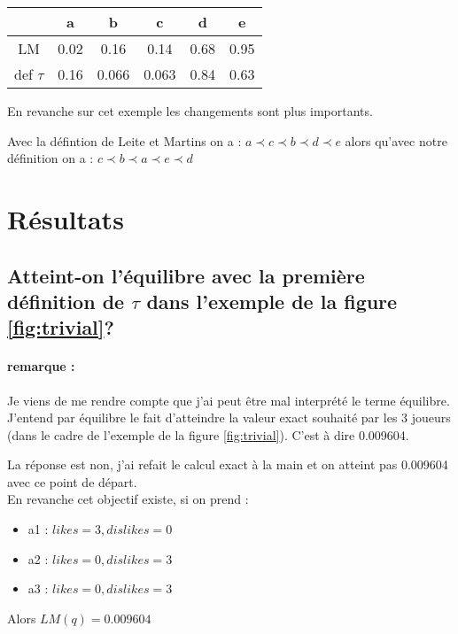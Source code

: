 \documentclass[12pt]{article}
\theoremstyle{defi}
\theoremstyle{not}
\theoremstyle{prob}
\begin{document}
          \begin{tabular}{|c|c|c|c|c|c|}
            \hline
                       & a    & b     & c     & d    & e \\
            \hline
            LM         & 0.02 & 0.16  & 0.14  & 0.68 & 0.95 \\
            \hline
            def $\tau$ & 0.16 & 0.066 & 0.063 & 0.84 & 0.63\\
            \hline
          \end{tabular}

          En revanche sur cet exemple les changements sont plus importants.

          Avec la défintion de Leite et Martins on a : $a \prec c \prec b \prec d \prec e$ alors qu'avec notre définition on a : $c \prec b \prec a \prec e \prec d$


  \section{Résultats}
  \color{red}
    \subsection{Atteint-on l'équilibre avec la première définition de $\tau$ dans l'exemple de la figure \ref{fig:trivial}?}

      \paragraph{remarque :}
        Je viens de me rendre compte que j'ai peut être mal interprété le terme équilibre.
        J'entend par équilibre le fait d'atteindre la valeur exact souhaité par les 3 joueurs (dans le cadre de l'exemple de la figure \ref{fig:trivial}).
        C'est à dire 0.009604.

        La réponse est non, j'ai refait le calcul exact à la main et on atteint pas 0.009604 avec ce point de départ.\\

    En revanche cet objectif existe, si on prend :
    \begin{itemize}
      \item a1 : $likes = 3, dislikes = 0$
      \item a2 : $likes = 0, dislikes = 3$
      \item a3 : $likes = 0, dislikes = 3$
    \end{itemize}

    Alors $LM(q) = 0.009604$\\
\end{document}
